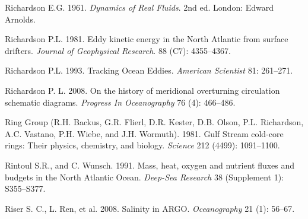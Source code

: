 \begin{thebibliography}{999}
Richardson E.G.  1961. \textit{Dynamics of Real Fluids}. 2nd
ed. London: Edward Arnolds.
%

Richardson P.L.  1981. Eddy kinetic energy in the North Atlantic from
surface drifters. \textit{Journal of Geophysical Research}. 88 (C7):
4355--4367.
%

Richardson P.L.  1993. Tracking Ocean Eddies. \textit{American
  Scientist} 81: 261--271.
%

Richardson P. L.  2008. On the history of meridional overturning
circulation schematic diagrams. \textit{Progress In Oceanography} 76
(4): 466--486.
%

Ring Group (R.H. Backus, G.R. Flierl, D.R. Kester, D.B. Olson,
P.L. Richardson, A.C. Vastano, P.H. Wiebe, and
J.H. Wormuth). 1981. Gulf Stream cold-core rings: Their physics,
chemistry, and biology. \textit{Science} 212 (4499): 1091--1100.
%

Rintoul S.R., and C. Wunsch.  1991. Mass, heat, oxygen and nutrient
fluxes and budgets in the North Atlantic Ocean. \textit{Deep-Sea
  Research} 38 (Supplement 1): S355--S377.
%

Riser S. C., L. Ren, et al.  2008. Salinity in
  ARGO. \textit{Oceanography} 21 (1): 56--67.
%


\end{thebibliography}
